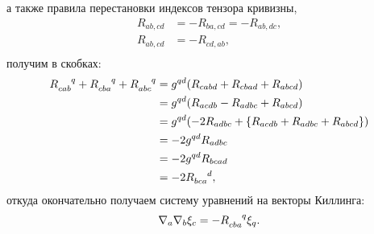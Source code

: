 \documentclass[12pt,a4paper]{article}
\begin{document}
            а также правила перестановки индексов тензора кривизны,
            \begin{equation}\begin{aligned}
                R_{ab,cd} &= - R_{ba,cd} = - R_{ab,dc}, \\
                R_{ab,cd} &= - R_{cd,ab}, \\
            \end{aligned}\end{equation}
            получим в скобках:
            \begin{equation}\begin{aligned}
                R_{cab}^{\hphantom{cab}q} +
                R_{cba}^{\hphantom{cba}q} +
                R_{abc}^{\hphantom{abc}q}
                    &= g^{qd} \qty(
                        R_{cabd} + R_{cbad} + R_{abcd}
                    ) \\
                    &= g^{qd} \qty(
                        R_{acdb} - R_{adbc} + R_{abcd}
                    ) \\
                    &= g^{qd} \qty(
                        - 2 R_{adbc} + \qty{ R_{acdb} + R_{adbc} + R_{abcd} }
                    ) \\
                    &= - 2 g^{qd} R_{adbc} \\
                    &= - 2 g^{qd} R_{bcad} \\
                    &= - 2 R_{bca}^{\hphantom{bca}d} ,
            \end{aligned}\end{equation}
            откуда окончательно получаем систему уравнений на векторы Киллинга:
            \begin{equation}\label{eq:killing_eq}
                \nabla_a \nabla_b \xi_c = - R_{cba}^{\hphantom{cba}q} \xi_q .
            \end{equation}
\end{document}
